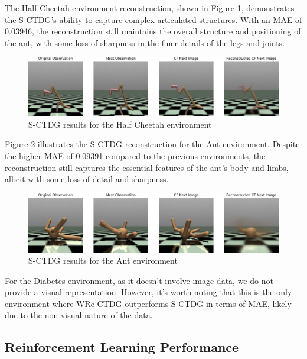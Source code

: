 The Half Cheetah environment reconstruction,
shown in Figure \ref{fig:half_cheetah_recon},
demonstrates the S-CTDG's ability to capture complex articulated structures.
With an MAE of 0.03946, the reconstruction still maintains
the overall structure and positioning of the ant, with some loss of
sharpness in the finer details of the legs and joints.

\begin{figure}[H]
    \centering
    \includegraphics[width=\textwidth]{figures/ch5/e2e_half.png}
    \caption{S-CTDG results for the Half Cheetah environment}
    \label{fig:half_cheetah_recon}
\end{figure}

Figure \ref{fig:ant_recon} illustrates the S-CTDG reconstruction
for the Ant environment. Despite the higher MAE of 0.09391 compared
to the previous environments, the reconstruction still captures
the essential features of the ant's body and limbs, albeit with
some loss of detail and sharpness.

\begin{figure}[H]
    \centering
    \includegraphics[width=\textwidth]{figures/ch5/e2e_ant.png}
    \caption{S-CTDG results for the Ant environment}
    \label{fig:ant_recon}
\end{figure}

For the Diabetes environment, as it doesn't involve image data,
we do not provide a visual representation. However, it's worth noting
that this is the only environment where WRe-CTDG outperforms S-CTDG
in terms of MAE, likely due to the non-visual nature of the data.

\subsection{Reinforcement Learning Performance}

